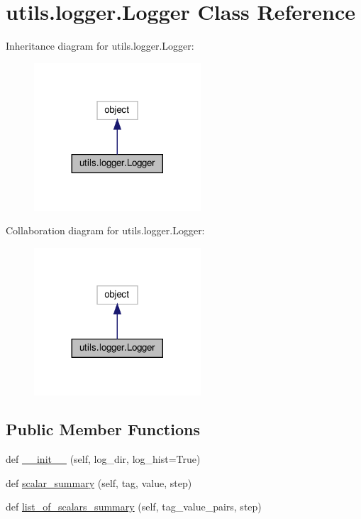 \hypertarget{classutils_1_1logger_1_1Logger}{}\section{utils.\+logger.\+Logger Class Reference}
\label{classutils_1_1logger_1_1Logger}


Inheritance diagram for utils.\+logger.\+Logger\+:
\nopagebreak
\begin{figure}[H]
\begin{center}
\leavevmode
\includegraphics[width=176pt]{classutils_1_1logger_1_1Logger__inherit__graph}
\end{center}
\end{figure}


Collaboration diagram for utils.\+logger.\+Logger\+:
\nopagebreak
\begin{figure}[H]
\begin{center}
\leavevmode
\includegraphics[width=176pt]{classutils_1_1logger_1_1Logger__coll__graph}
\end{center}
\end{figure}
\subsection*{Public Member Functions}
\begin{DoxyCompactItemize}
\item 
def \hyperlink{classutils_1_1logger_1_1Logger_aa25ef3824d13fe2b0fb812e40b61fe07}{\+\_\+\+\_\+init\+\_\+\+\_\+} (self, log\+\_\+dir, log\+\_\+hist=True)
\item 
def \hyperlink{classutils_1_1logger_1_1Logger_ab78ca0bbf04ac70e697670639938b99a}{scalar\+\_\+summary} (self, tag, value, step)
\item 
def \hyperlink{classutils_1_1logger_1_1Logger_ab39b200c1f09fca5cbd65ae39752f7b2}{list\+\_\+of\+\_\+scalars\+\_\+summary} (self, tag\+\_\+value\+\_\+pairs, step)
\end{DoxyCompactItemize}
